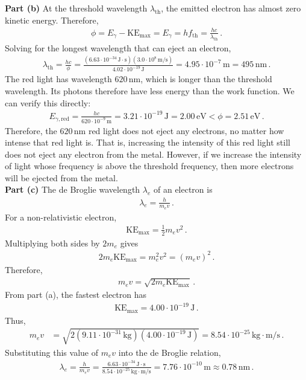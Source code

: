 \documentclass[11pt]{article}
\begin{document}
\noindent\textbf{Part (b)} At the threshold wavelength $\lambda_{\text{th}}$, the emitted electron has almost zero kinetic energy. Therefore,
\begin{align*}
\phi=E_{\gamma}- \text{KE}_{\max} = E_{\gamma} =hf_{\text{th}}= \frac{hc}{\lambda_{\text{th}}}\,.
\end{align*}
Solving for the longest wavelength that can eject an electron,
\begin{align*}
\lambda_{\text{th}}
=\frac{hc}{\phi}=\frac{(6.63\cdot 10^{-34}\,\text{J}\cdot\text{s})(3.0\cdot 10^8\,\text{m/s})}
{4.02\cdot 10^{-19}\,\text{J}}=4.95\cdot 10^{-7}\,\text{m}
=495\,\text{nm}\,.
\end{align*}
The red light has wavelength $620\,$nm, which is longer than the threshold wavelength. Its photons therefore have less energy than the work function. We can verify this directly:
\begin{align*}
E_{\gamma,\text{red}}=\frac{hc}{620\cdot 10^{-9}\,\text{m}}=3.21\cdot 10^{-19}\,\text{J}
=2.00\,\text{eV}<\phi=2.51\,\text{eV}\,.
\end{align*}
Therefore, the $620\,$nm red light does not eject any electrons, no matter how intense that red light is. That is, increasing the intensity of this red light still does not eject any electron from the metal. However, if we increase the intensity of light whose frequency is above the threshold frequency, then more electrons will be ejected from the metal.\\

\noindent\textbf{Part (c)} The de Broglie wavelength $\lambda_e$ of an electron is
\begin{align*}
\lambda_e=\frac{h}{m_ev}\,.
\end{align*}
For a non-relativistic electron,
\begin{align*}
\text{KE}_{\max}=\frac{1}{2}m_ev^2\,.
\end{align*}
Multiplying both sides by $2m_e$ gives
\begin{align*}
2m_e\text{KE}_{\max}
=m_e^2v^2
=(m_ev)^2\,.
\end{align*}
Therefore,
\begin{align*}
m_ev=\sqrt{2m_e\text{KE}_{\max}}\,.
\end{align*}
From part (a), the fastest electron has
\begin{align*}
\text{KE}_{\max}=4.00\cdot 10^{-19}\,\text{J}\,.
\end{align*}
Thus,
\begin{align*}
m_ev
&=\sqrt{2(9.11\cdot 10^{-31}\,\text{kg})
(4.00\cdot 10^{-19}\,\text{J})}
=8.54\cdot 10^{-25}\,\text{kg}\cdot\text{m/s}\,.
\end{align*}
Substituting this value of $m_ev$ into the de Broglie relation,
\begin{align*}
\lambda_e=\frac{h}{m_ev}
=\frac{6.63\cdot 10^{-34}\,\text{J}\cdot\text{s}}
{8.54\cdot 10^{-25}\,\text{kg}\cdot\text{m/s}}=7.76\cdot 10^{-10}\,\text{m}\approx 0.78\,\text{nm}\,.
\end{align*}
\end{document}

